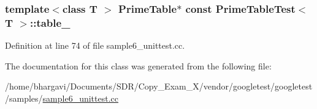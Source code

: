 \subsubsection[{\texorpdfstring{table\+\_\+}{table_}}]{\setlength{\rightskip}{0pt plus 5cm}template$<$class T $>$ {\bf Prime\+Table}$\ast$ const {\bf Prime\+Table\+Test}$<$ {\bf T} $>$\+::table\+\_\+\hspace{0.3cm}{\ttfamily [protected]}}\hypertarget{class_prime_table_test_a86da90fc6d5cef6386d0cd8fb52b4046}{}\label{class_prime_table_test_a86da90fc6d5cef6386d0cd8fb52b4046}


Definition at line 74 of file sample6\+\_\+unittest.\+cc.



The documentation for this class was generated from the following file\+:\begin{DoxyCompactItemize}
\item 
/home/bhargavi/\+Documents/\+S\+D\+R/\+Copy\+\_\+\+Exam\+\_\+X/vendor/googletest/googletest/samples/\hyperlink{sample6__unittest_8cc}{sample6\+\_\+unittest.\+cc}\end{DoxyCompactItemize}
